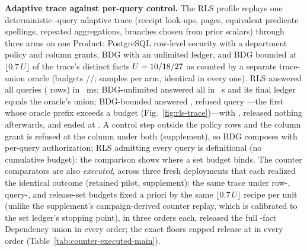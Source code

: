 \documentclass[10pt,journal,compsoc]{IEEEtran}
\begin{document}
\textbf{Adaptive trace against per-query control.} The RLS profile replays
one deterministic \FinalVFivePublicationRLSQueries{}-query adaptive trace
(receipt look-ups, pages, equivalent predicate spellings, repeated
aggregations, branches chosen from prior scalars) through three arms on one
Product: PostgreSQL row-level security with a department policy and column
grants, BDG with an unlimited ledger, and BDG bounded at
$\lfloor 0.7\,U\rfloor$ of the trace's distinct facts
$U=10{}/18{}/27{}$
as counted by a separate trace-union oracle (budgets
\FinalVFivePublicationRLSBudgetRelease{}/\FinalVFivePublicationRLSBudgetDependency{}/\FinalVFivePublicationRLSBudgetOutcome{};
\FinalVFivePublicationRLSPerCell{} samples per arm, identical in every one).
RLS answered all \FinalVFivePublicationRLSQueries{} queries
(\FinalVFivePublicationRLSRowsRLS{} rows) in
\FinalVFivePublicationRLSDrainRLSMS{}~ms; BDG-unlimited answered all in
\FinalVFivePublicationRLSDrainUnlimitedS{}~s and its final ledger equals the
oracle's union; BDG-bounded answered
\FinalVFivePublicationRLSBoundedSuccessful{},
refused query \FinalVFivePublicationRLSBoundedRefusalIndex{}---the first
whose oracle prefix exceeds a budget (Fig.~\ref{fig:rls-trace})---with
\FinalVFivePublicationAttackThresholdRejectionCode{}, released nothing
afterwards, and ended at \FinalVFivePublicationRLSBoundedLedger{}. A control
step outside the policy rows and the column grant is refused at the column
under both (supplement), so BDG composes with per-query authorization;
RLS admitting every query is definitional (no cumulative budget): the
comparison shows where a set budget binds. The counter comparators are also \emph{executed}, across three fresh
deployments that each realized the identical outcome (retained pilot,
supplement): the same trace under row-, query-, and release-set budgets
fixed a priori by the same $\lfloor 0.7\,U\rfloor$ recipe per unit
(unlike the supplement's campaign-derived counter replay, which is
calibrated to the set ledger's stopping point), in three orders each,
released the full \FinalVFiveCounterNaiveMinDep{}-fact Dependency union in
every order; the exact floors capped release at
\FinalVFiveCounterExactMaxDep{} in every order
(Table~\ref{tab:counter-executed-main}).
\end{document}

